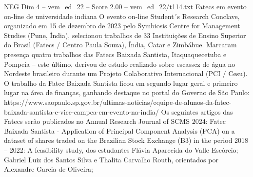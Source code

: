 \begin{textsample}{NEG Dim 4 – vem\_ed\_22 – Score 2.00 – vem\_ed\_22/t114.txt}  \label{ex:f4_neg_018}
Fatecs em evento on-line de universidade indiana O evento on-line Student´s Research Conclave, organizado em 15 de dezembro de 2023 pelo Symbiosis Centre for Management Studies (Pune, Índia), selecionou trabalhos de 33 Instituições de Ensino Superior do Brasil (Fatecs / Centro Paula Souza), Índia, Catar e Zimbábue.
Marcaram presença quatro trabalhos das Fatecs Baixada Santista, Itaquaquecetuba e Pompeia – este último, derivou de estudo realizado sobre escassez de água no Nordeste brasileiro durante um Projeto Colaborativo Internacional (PCI / Cesu).
O trabalho da Fatec Baixada Santista ficou em segundo lugar geral e primeiro lugar na área de finanças, ganhando destaque no portal do Governo de São Paulo: https://www.saopaulo.sp.gov.br/ultimas-noticias/equipe-de-alunos-da-fatec-baixada-santista-e-vice-campea-em-evento-na-india/ Os seguintes artigos das Fatecs serão publicados no Annual Research Journal of SCMS 2024: Fatec Baixada Santista - Application of Principal Component Analysis (PCA) on a dataset of shares traded on the Brazilian Stock Exchange (B3) in the period 2018 – 2022: A feasibility study, dos estudantes Flávia Aparecida do Valle Escórcio; Gabriel Luiz dos Santos Silva e Thalita Carvalho Routh, orientados por Alexandre Garcia de Oliveira;

\end{textsample}
